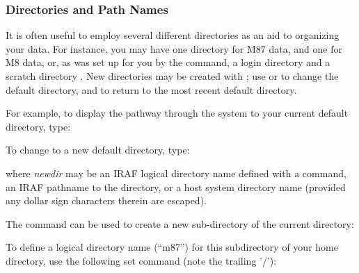 \subsubsection{Directories and Path Names}

\ppind
It is often useful to employ several different directories as an aid to 
organizing your data.  For instance, you may have one directory for M87 data, 
and one for M8 data, or, as was set up for you by the  command,
a login directory  and a scratch directory .
New directories may be created with ; use 
or  to change the default directory, and  to
return to the most recent default directory.

For example, to display the pathway through the system to your current
default directory, type:

\begin{quotation}\noindent
{} 
\end{quotation}

\noindent
To change to a new default directory, type:

\begin{quotation}\noindent
{} 
\end{quotation}

\noindent
where {\it newdir} may be an IRAF logical directory name defined 
with a  command, an IRAF pathname to the directory,
or a host system directory name (provided any dollar sign characters
therein are escaped).

The  command can be used to create a new sub-directory
of the current directory:

\begin{quotation}\noindent
{} 
\end{quotation}

\noindent
To define a logical directory name (``m87'') for this subdirectory 
of your home directory, use the following set command (note the trailing '/'):

\begin{quotation}\noindent
{} \footnotemark
\end{quotation}


